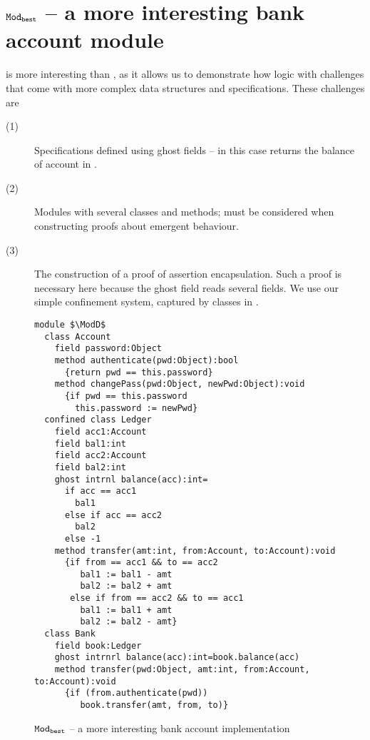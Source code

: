 \section{ ${\texttt{Mod}}_{{\texttt{best}}}$  -- a more interesting bank account module}

\label{app:BankAccount}

\ModD  is more interesting than \ModC, as it allows us  to demonstrate how   \Nec logic 
 with  challenges that come with more complex data structures and specifications.
These challenges are 
\begin{description}
\item[(1)] Specifications defined using ghost fields -- in this case  returns the balance of account  in  .
\item[(2)] Modules with several    classes and methods;  must be considered when constructing proofs about emergent behaviour.
\item[(3)]  The construction of a proof of assertion encapsulation. Such a proof is necessary  here because
 the ghost field  reads several  fields. We use our 
 simple confinement system,  captured by \enclosed classes in \Loo.
\end{description}


\begin{figure}[h]
\begin{lstlisting}[language=chainmail, mathescape=true, frame=lines]
module $\ModD$
  class Account
    field password:Object
    method authenticate(pwd:Object):bool
      {return pwd == this.password}
    method changePass(pwd:Object, newPwd:Object):void
      {if pwd == this.password
        this.password := newPwd}
  confined class Ledger
    field acc1:Account
    field bal1:int
    field acc2:Account
    field bal2:int
    ghost intrnl balance(acc):int=
      if acc == acc1
        bal1
      else if acc == acc2
        bal2
      else -1
    method transfer(amt:int, from:Account, to:Account):void
      {if from == acc1 && to == acc2
         bal1 := bal1 - amt
         bal2 := bal2 + amt
       else if from == acc2 && to == acc1
         bal1 := bal1 + amt
         bal2 := bal2 - amt}
  class Bank
    field book:Ledger
    ghost intrnrl balance(acc):int=book.balance(acc)
    method transfer(pwd:Object, amt:int, from:Account, to:Account):void
      {if (from.authenticate(pwd))
         book.transfer(amt, from, to)}
\end{lstlisting}
\caption{${\texttt{Mod}}_{{\texttt{best}}}$ -- a more interesting bank account implementation}
\label{f:ex-bank-short}
\end{figure}
 
